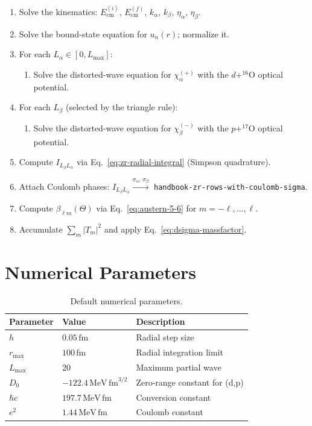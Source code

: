 \documentclass[12pt,a4paper]{article}
\newcommand{\fm}{\,\mathrm{fm}}
\newcommand{\MeV}{\,\mathrm{MeV}}
\begin{document}
\begin{enumerate}
  \item Solve the kinematics: $E_\mathrm{cm}^{(i)}$, $E_\mathrm{cm}^{(f)}$,
        $k_\alpha$, $k_\beta$, $\eta_\alpha$, $\eta_\beta$.
  \item Solve the bound-state equation for $u_n(r)$; normalize it.
  \item For each $L_\alpha \in [0, L_\mathrm{max}]$:
    \begin{enumerate}
      \item Solve the distorted-wave equation for $\chi_\alpha^{(+)}$
            with the $d$+${}^{16}$O optical potential.
    \end{enumerate}
  \item For each $L_\beta$ (selected by the triangle rule):
    \begin{enumerate}
      \item Solve the distorted-wave equation for $\chi_\beta^{(-)}$
            with the $p$+${}^{17}$O optical potential.
    \end{enumerate}
  \item Compute $I_{L_\beta L_\alpha}$ via Eq.~\eqref{eq:zr-radial-integral}
        (Simpson quadrature).
  \item Attach Coulomb phases: $I_{L_\beta L_\alpha}
        \xrightarrow{\sigma_\alpha,\,\sigma_\beta}$
        \texttt{handbook-zr-rows-with-coulomb-sigma}.
  \item Compute $\beta_{\ell m}(\Theta)$ via Eq.~\eqref{eq:austern-5-6}
        for $m = -\ell, \ldots, \ell$.
  \item Accumulate $\sum_m |T_m|^2$ and apply Eq.~\eqref{eq:dsigma-massfactor}.
\end{enumerate}

\section{Numerical Parameters}

\begin{table}[h]
\centering
\caption{Default numerical parameters.}
\label{tab:numerics}
\begin{tabular}{lll}
\toprule
Parameter & Value & Description \\
\midrule
$h$        & $0.05\fm$  & Radial step size \\
$r_\mathrm{max}$ & $100\fm$ & Radial integration limit \\
$L_\mathrm{max}$ & 20       & Maximum partial wave \\
$D_0$      & $-122.4\MeV\fm^{3/2}$ & Zero-range constant for (d,p) \\
$\hbar c$  & $197.7\MeV\fm$      & Conversion constant \\
$e^2$      & $1.44\MeV\fm$       & Coulomb constant \\
\bottomrule
\end{tabular}
\end{table}
\end{document}
